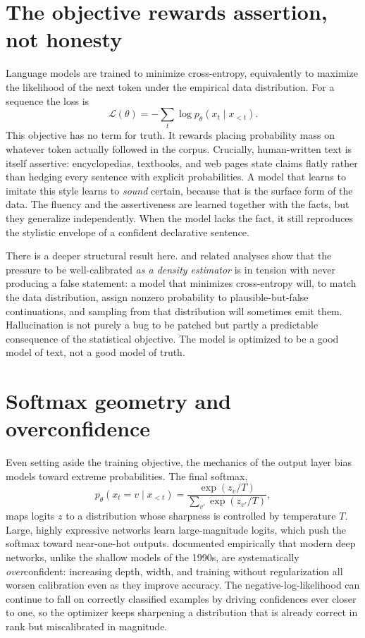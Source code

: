 \documentclass[11pt]{article}
\begin{document}
\section{The objective rewards assertion, not honesty}
Language models are trained to minimize cross-entropy, equivalently to maximize the likelihood of the next token under the empirical data distribution. For a sequence the loss is
\[
\mathcal{L}(\theta) = -\sum_{t} \log p_\theta(x_t \mid x_{<t}).
\]
This objective has no term for truth. It rewards placing probability mass on whatever token actually followed in the corpus. Crucially, human-written text is itself assertive: encyclopedias, textbooks, and web pages state claims flatly rather than hedging every sentence with explicit probabilities. A model that learns to imitate this style learns to \emph{sound} certain, because that is the surface form of the data. The fluency and the assertiveness are learned together with the facts, but they generalize independently. When the model lacks the fact, it still reproduces the stylistic envelope of a confident declarative sentence.

There is a deeper structural result here. \citet{kalai2024calibrated} and related analyses show that the pressure to be well-calibrated \emph{as a density estimator} is in tension with never producing a false statement: a model that minimizes cross-entropy will, to match the data distribution, assign nonzero probability to plausible-but-false continuations, and sampling from that distribution will sometimes emit them. Hallucination is not purely a bug to be patched but partly a predictable consequence of the statistical objective. The model is optimized to be a good model of text, not a good model of truth.

\section{Softmax geometry and overconfidence}
Even setting aside the training objective, the mechanics of the output layer bias models toward extreme probabilities. The final softmax,
\[
p_\theta(x_t = v \mid x_{<t}) = \frac{\exp(z_v / T)}{\sum_{v'} \exp(z_{v'}/T)},
\]
maps logits $z$ to a distribution whose sharpness is controlled by temperature $T$. Large, highly expressive networks learn large-magnitude logits, which push the softmax toward near-one-hot outputs. \citet{guo2017calibration} documented empirically that modern deep networks, unlike the shallow models of the 1990s, are systematically \emph{over}confident: increasing depth, width, and training without regularization all worsen calibration even as they improve accuracy. The negative-log-likelihood can continue to fall on correctly classified examples by driving confidences ever closer to one, so the optimizer keeps sharpening a distribution that is already correct in rank but miscalibrated in magnitude.
\end{document}
